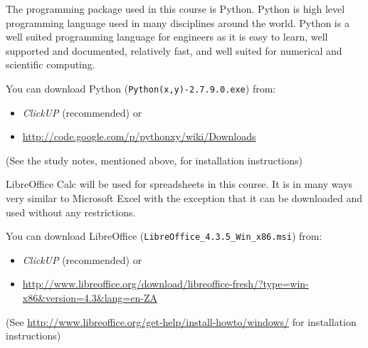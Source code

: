         The programming package used in this course is Python. Python is
        high level programming language used in many disciplines around the
        world. Python is a well suited programming language for engineers as
        it is easy to learn, well supported and documented, relatively fast,
        and well suited for numerical and scientific computing.

        You can download Python ({\tt Python(x,y)-2.7.9.0.exe}) from:
        \begin{itemize}
            \item {\it ClickUP} (recommended) or
            \item \url{http://code.google.com/p/pythonxy/wiki/Downloads}
        \end{itemize}
        (See the study notes, mentioned above, for installation instructions)

        LibreOffice Calc will be used for spreadsheets in this course. It is
        in many ways very similar to Microsoft Excel with the exception
        that it can be downloaded and used without any restrictions.

        You can download LibreOffice
        ({\tt LibreOffice\_4.3.5\_Win\_x86.msi}) from:
        \begin{itemize}
            \item {\it ClickUP} (recommended) or
            \item \url{http://www.libreoffice.org/download/libreoffice-fresh/?type=win-x86&version=4.3&lang=en-ZA}
        \end{itemize}
        (See \url{http://www.libreoffice.org/get-help/install-howto/windows/}
        for installation instructions)
